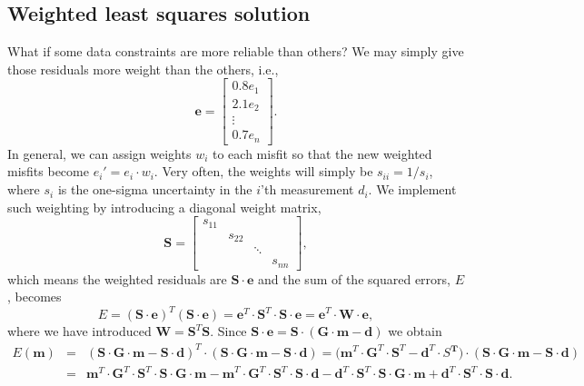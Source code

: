 \subsection{Weighted least squares solution}

	What if some data constraints are more reliable than others? We may simply give those residuals more 
weight than the others, i.e.,
\begin{equation}
\mathbf{e} = \left[ \begin{array}{c} 0.8 e_1 \\ 2.1e_2\\ \vdots \\ 0.7 e_n \end{array} \right ] .
\end{equation}	 
In general, we can assign weights $w_i$ to each misfit so that the new weighted misfits become $e_i' = e_i\cdot w_i$.
Very often, the weights will simply be $s_{ii} = 1/s_i$, where $s_i$ is the one-sigma uncertainty in the $i$'th measurement $d_i$.
We implement such weighting by introducing a diagonal weight matrix,
\begin{equation}
{\mathbf S} = \left[\begin{array}{cccc}
s_{11} \\ & s_{22}\\ & & \ddots\\ & & & s_{nn} \end{array}
  \right ],
\end{equation}
which means the weighted residuals are $\mathbf{S}\cdot\mathbf{e}$ and the sum of the squared errors, $E$, becomes
\begin{equation}
E = \left (\mathbf{S}\cdot\mathbf{e}\right )^T\left (\mathbf{S}\cdot\mathbf{e}\right ) = \mathbf{e}^T \cdot \mathbf{S}^T \cdot \mathbf{S \cdot e = e}^T \cdot \mathbf{W \cdot e},
\end{equation}	 
where we have introduced $\mathbf{W = S}^T\mathbf{S}$. Since $\mathbf{S} \cdot \mathbf{e = S\cdot(G \cdot m - d)}$ we obtain
\begin{equation}
\begin{array}{rcl}
E(\mathbf{m}) & = & \mathbf{(S \cdot G \cdot m - S\cdot d)}^T \cdot \mathbf{(S \cdot G \cdot m - S \cdot d)} =
(\mathbf{m}^T \cdot \mathbf{G}^T \cdot \mathbf{S}^T - \mathbf{d}^T \cdot S\mathbf{^T) \cdot (S \cdot G \cdot m - S \cdot d)}\\
& = & \mathbf{m}^T \cdot \mathbf{G} ^T \cdot \mathbf{S}^T \cdot \mathbf{S \cdot G \cdot  m - m}^T \cdot \mathbf{G}^T \cdot \mathbf{S}^T \cdot \mathbf{S \cdot d - d}^T \cdot \mathbf{S}^T \cdot \mathbf{S \cdot G  \cdot m + d}^T \cdot \mathbf{S}^T \cdot \mathbf{S \cdot d}.
\end{array}
\end{equation}

